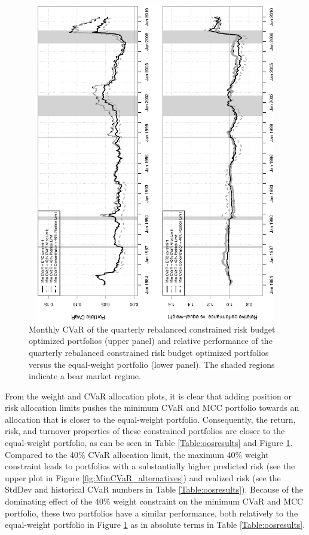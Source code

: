 \documentclass[12pt,a4paper]{article}
\begin{document}
\begin{figure}[tb]
\begin{center}
\caption{Monthly CVaR of the quarterly rebalanced constrained risk budget optimized portfolios (upper panel) and relative performance of the quarterly rebalanced constrained risk budget optimized portfolios versus the equal-weight portfolio (lower panel). The shaded regions indicate a bear market regime. \label{fig:relperformance_alternatives}  }
\includegraphics[width=12cm,height=14cm,angle=270]{portfolioCVaRRelPerf_CC_alternatives.eps}
\end{center}
\end{figure}

From the weight and CVaR allocation plots, it is clear that adding position or risk allocation limits pushes the minimum CVaR and MCC portfolio towards an allocation that is closer to the equal-weight portfolio. Consequently, the return, risk, and turnover properties of these constrained portfolios are closer to the equal-weight portfolio, as can be seen in Table \ref{Table:oosresults} and Figure \ref{fig:relperformance_alternatives}. Compared to the 40\% CVaR allocation limit, the maximum 40\% weight constraint leads to portfolios with a substantially higher predicted risk (see the upper plot in Figure \ref{fig:MinCVaR_alternatives}) and realized risk (see the StdDev and historical CVaR numbers in Table \ref{Table:oosresults}). Because of the dominating effect of the 40\% weight constraint on the minimum CVaR and MCC portfolio, these two portfolios have a similar performance, both relatively to the equal-weight portfolio in Figure \ref{fig:relperformance_alternatives} as in absolute terms in Table \ref{Table:oosresults}.
\end{document}
